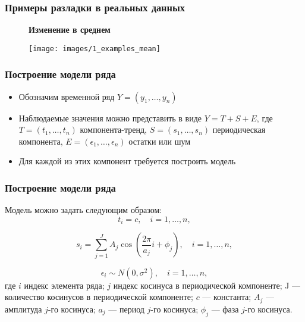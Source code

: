 \documentclass[intlimits, 9pt, unicode]{beamer}
\begin{document}
\begin{frame}
\frametitle{Примеры разладки в реальных данных}
\begin{figure}
\textbf{Изменение в среднем}\par\medskip
\texttt{[image: images/1\_examples\_mean]}
\end{figure}
\end{frame}

\begin{frame}
    \frametitle{Построение модели ряда}

    \begin{itemize}
    	\item Обозначим временной ряд $Y = (y_1, \dots, y_n)$
    \vspace{0.5cm}
	 \item Наблюдаемые значения можно представить в виде $Y = T + S + E$, где  $ T = (t_1, \dots, t_n) $ компонента-тренд, $ S = (s_1, \dots, s_n) $ периодическая компонента, $ E = (\epsilon_1, \dots, \epsilon_n) $ остатки или шум
    \vspace{0.5cm}
        \item Для каждой из этих компонент требуется построить модель
    \end{itemize}

\end{frame}


\begin{frame}
    \frametitle{Построение модели ряда}

Модель можно задать следующим образом:
\begin{equation*}
t_i = c, \quad i = 1, \dots, n, 
\end{equation*}

\begin{equation*}
s_i = \sum_{j=1}^{J}{A_j \cos \left( \frac{2\pi}{a_j} i + \phi_j \right)}, \quad i = 1, \dots, n,
\end{equation*}

\begin{equation*}
\epsilon_i \sim N(0, \sigma^2), \quad i = 1, \dots, n, 
\end{equation*}
где $i$ индекс элемента ряда; $j$ индекс косинуса в периодической компоненте; J --- количество косинусов в периодической компоненте; $c$ --- константа; $A_j$ --- амплитуда $j$-го косинуса; $a_j$ --- период $j$-го косинуса; $\phi_j$ --- фаза $j$-го косинуса.

\end{frame}
\end{document}

